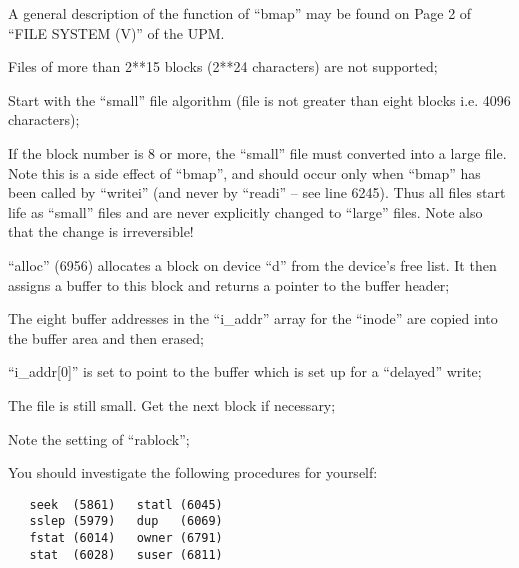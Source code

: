 A general description of the function
of ``bmap'' may be found on Page 2 of
``FILE SYSTEM (V)'' of the UPM.

\bd
\item[6423:] Files of more than 2**15 blocks
 (2**24 characters) are not supported;

\item[6427:] Start with the ``small'' file algorithm (file is not greater than
 eight blocks i.e. 4096 characters);

\item[6431:] If the block number is 8 or more,
the ``small'' file must converted
into a large file. Note this is
a side effect of ``bmap'', and
should occur only when ``bmap'' has
been called by ``writei'' (and
never by ``readi'' -- see line
6245). Thus all files start life
as ``small'' files and are never
explicitly changed to ``large''
files. Note also that the change
is irreversible!

\item[6435:] ``alloc'' (6956) allocates a block
on device ``d'' from the device's
free list. It then assigns a
buffer to this block and returns
a pointer to the buffer header;

\item[6438:] The eight buffer addresses in the
``i\_addr'' array for the ``inode''
are copied into the buffer area
and then erased;

\item[6442:] ``i\_addr[0]'' is set to point to
 the buffer which is set up for a
 ``delayed'' write;

\item[6448:] The file is still small. Get the
next block if necessary;

\item[6456:] Note the setting of ``rablock'';
\ed


You should investigate the following
procedures for yourself:

\begin{verbatim}
   seek  (5861)   statl (6045)
   sslep (5979)   dup   (6069)
   fstat (6014)   owner (6791)
   stat  (6028)   suser (6811)
\end{verbatim}

